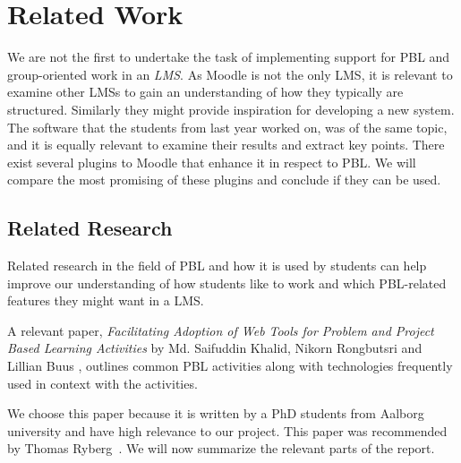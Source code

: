 \chapter{Related Work}
\label{chap:relatedwork}
We are not the first to undertake the task of implementing support for PBL and group-oriented work in an \textit{LMS}. 
As Moodle is not the only LMS, it is relevant to examine other LMSs to gain an understanding of how they typically are structured. 
Similarly they might provide inspiration for developing a new system.
The software that the students from last year worked on, was of the same topic, and it is equally relevant to examine their results and extract key points.
There exist several plugins to Moodle that enhance it in respect to PBL. 
We will compare the most promising of these plugins and conclude if they can be used.

\section{Related Research}
\label{sec:research}
Related research in the field of PBL and how it is used by students can help improve our understanding of how students like to work and which PBL-related features they might want in a LMS.
 
A relevant paper, \textit{Facilitating Adoption of Web Tools for Problem and Project Based Learning Activities} by Md. Saifuddin Khalid, Nikorn Rongbutsri and Lillian Buus \citep{khalidRongbutsriBuus}, outlines common PBL activities along with technologies frequently used in context with the activities.

We choose this paper because it is written by a PhD students from Aalborg university and have high relevance to our project. This paper was recommended by Thomas Ryberg~\cite{thomas}. We will now summarize the relevant parts of the report.  

